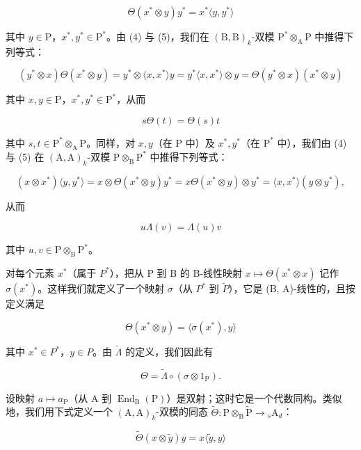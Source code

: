 \[
\Theta (x ^ {*} \otimes y) y ^ {*} = x ^ {*} \langle y, y ^ {*} \rangle\tag{5}
\]

其中 \(y \in \mathrm{P}\)，\(x^{*}, y^{*} \in \mathrm{P}^{*}\)。由 (4) 与 (5)，我们在 \((\mathrm{B}, \mathrm{B})_{k}\)-双模 \(\mathrm{P}^{*} \otimes_{\mathrm{A}} \mathrm{P}\) 中推得下列等式：

\[
(y ^ {*} \otimes x) \Theta (x ^ {*} \otimes y) = y ^ {*} \otimes \langle x, x ^ {*} \rangle y = y ^ {*} \langle x, x ^ {*} \rangle \otimes y = \Theta (y ^ {*} \otimes x) (x ^ {*} \otimes y)
\]

其中 \(x, y \in \mathrm{P}\)，\(x^{*}, y^{*} \in \mathrm{P}^{*}\)，从而

\[
s \Theta (t) = \Theta (s) t\tag{6}
\]

其中 \(s, t \in \mathrm{P}^* \otimes_{\mathrm{A}} \mathrm{P}\)。同样，对 \(x, y\)（在 \(\mathrm{P}\) 中）及 \(x^*, y^*\)（在 \(\mathrm{P}^*\) 中），我们由 (4) 与 (5) 在 \((\mathrm{A}, \mathrm{A})_k\)-双模 \(\mathrm{P} \otimes_{\mathrm{B}} \mathrm{P}^*\) 中推得下列等式：

\[
(x \otimes x ^ {*}) \langle y, y ^ {*} \rangle = x \otimes \Theta (x ^ {*} \otimes y) y ^ {*} = x \Theta (x ^ {*} \otimes y) \otimes y ^ {*} = \langle x, x ^ {*} \rangle (y \otimes y ^ {*}),
\]

从而

\[
u \Lambda (v) = \Lambda (u) v\tag{7}
\]

其中 \(u, v \in \mathrm{P} \otimes_{\mathrm{B}} \mathrm{P}^{*}\)。

对每个元素 \(x^{*}\)（属于 \(P^{*}\)），把从 P 到 B 的 B-线性映射 \(x \mapsto \Theta(x^{*} \otimes x)\) 记作 \(\sigma(x^{*})\)。这样我们就定义了一个映射 \(\sigma\)（从 \(P^{*}\) 到 \(\widetilde{P}\)），它是 (B, A)-线性的，且按定义满足

\[
\Theta (x ^ {*} \otimes y) = \langle \sigma (x ^ {*}), y \rangle\tag{8}
\]

其中 \(x^{*} \in P^{*}\)，\(y \in P\)。由 \(\widetilde{\Lambda}\) 的定义，我们因此有

\[
\Theta = \widetilde {\Lambda} \circ (\sigma \otimes 1 _ {\mathrm{P}}).\tag{9}
\]

设映射 \(a \mapsto a_{\mathrm{P}}\)（从 A 到 \(\operatorname{End}_{\mathrm{B}}(\mathrm{P})\)）是双射；这时它是一个代数同构。类似地，我们用下式定义一个 \((\mathrm{A}, \mathrm{A})_k\)-双模的同态 \(\widetilde{\Theta}: \mathrm{P} \otimes_{\mathrm{B}} \widetilde{\mathrm{P}} \to {}_s \mathrm{A}_d\)：

\[
\widetilde {\Theta} (x \otimes \widetilde {y}) y = x \langle \widetilde {y}, y \rangle\tag{10}
\]

